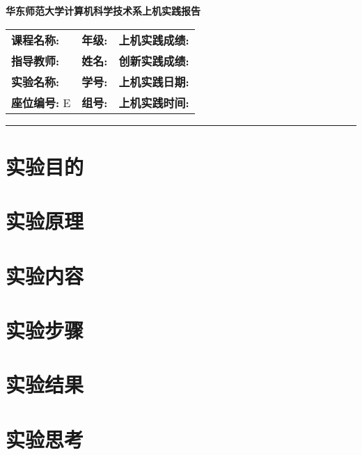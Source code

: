 \documentclass[twoside]{article}
\begin{document}
{\bfseries \LARGE{华东师范大学计算机科学技术系上机实践报告}}
\begin{center}
\begin{tabular}{p{5cm}p{5cm}p{5cm}}
\textbf{课程名称:} & \textbf{年级:}   & \textbf{上机实践成绩:} \\
\textbf{指导教师:}  & \textbf{姓名:}  & \textbf{创新实践成绩:}\\
\textbf{实验名称:}  & \textbf{学号:}  & \textbf{上机实践日期:}\\
\textbf{座位编号:} E & \textbf{组号:}  &\textbf{上机实践时间:} 
\end{tabular}
\end{center}
\rule{15cm}{1mm} 

\section{实验目的}

\section{实验原理}


\section{实验内容}
\section{实验步骤}

\section{实验结果}

\section{实验思考}
\end{document}
